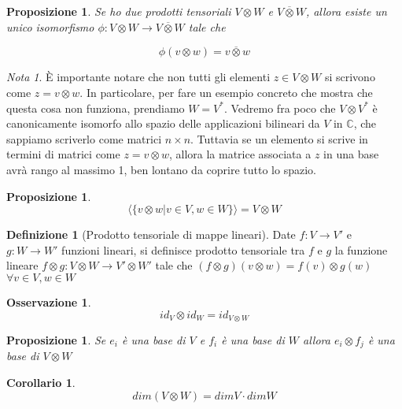 \documentclass[11pt]{article}
\theoremstyle{plain}
\newtheorem{prop}[thm]{Proposizione}
\newtheorem*{cor}{Corollario}
\theoremstyle{definition}
\newtheorem{defn}{Definizione}[section]
\newtheorem*{rem}{Osservazione}
\theoremstyle{remark}
\newtheorem*{note}{Nota}
\newcommand{\C}{\mathbb{C}}
\begin{document}
\begin{prop}
Se ho due prodotti tensoriali $V \otimes W$ e $V \overline{\otimes} W$, allora esiste un unico isomorfismo 
$\phi: V \otimes W \to V \overline{\otimes} W$ tale che

\[ \phi (v\otimes w) = v \overline{\otimes} w\]
\end{prop}


\begin{note}
\`E importante notare che non tutti gli elementi $z \in V \otimes W$ si scrivono come $z = v \otimes w$. In particolare, per fare un esempio concreto che mostra che questa cosa non funziona, prendiamo $W = V^*$. Vedremo fra poco che $V\otimes V^*$ è canonicamente isomorfo allo spazio delle applicazioni bilineari da $V$ in $\C$, che sappiamo scriverlo come matrici $n\times n$. Tuttavia se un elemento si scrive in termini di matrici come $z = v\otimes w$, allora la matrice associata a $z$ in una base avrà rango al massimo 1, ben lontano da coprire tutto lo spazio.
\end{note}


\begin{prop}
\[\langle\{ v \otimes w | v \in V, w \in W\} \rangle  = V \otimes W\]

\end{prop}


\begin{defn}[Prodotto tensoriale di mappe lineari]
Date $f:V \to V'$ e $g:W \to W'$ funzioni lineari, si definisce prodotto tensoriale tra $f$ e $g$ la funzione lineare $f \otimes g : V \otimes W \to V' \otimes W'$ tale che $(f \otimes g)(v \otimes w)=f(v) \otimes g(w)$ $\forall v\in V, w\in W$

\end{defn}

\begin{rem}

\[ id_V \otimes id_W = id_{V\otimes W}\]
\end{rem}




\begin{prop}

Se $e_i$ è una base di $V$ e $f_i$ è una base di $W$ allora $e_i \otimes f_j$ è una base di $V \otimes W$
\end{prop}


\begin{cor}
\[dim(V \otimes W) = dim V \cdot dim W \]

\end{cor}
\end{document}
